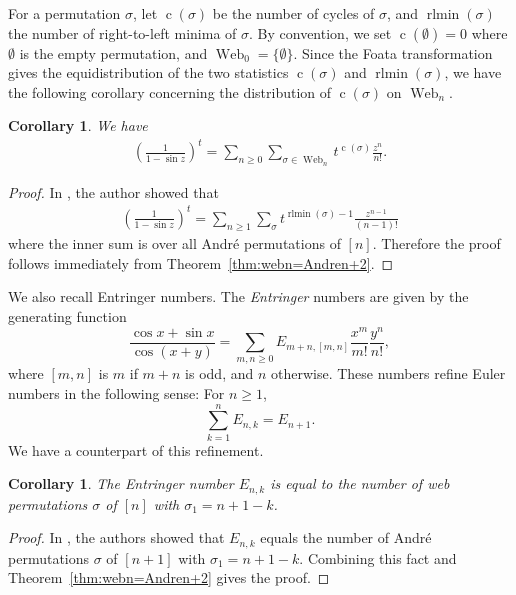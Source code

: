 \documentclass[reqno,12pt]{amsart}
\newtheorem{cor}[thm]{Corollary}
\theoremstyle{definition}
\theoremstyle{remark}
\newcommand\rlmin{\operatorname{rlmin}}
\newcommand\cc{\operatorname{c}}
\newcommand\Web{\operatorname{Web}}
\begin{document}
For a permutation \( \sigma \), let \( \cc(\sigma) \) be the number of cycles of
\( \sigma \), and \( \rlmin(\sigma) \) the number of right-to-left minima of
\( \sigma \).
By convention, we set \( \cc(\emptyset) = 0 \) where \( \emptyset \) is
the empty permutation, and \( \Web_0=\{\emptyset\}. \)
Since the Foata transformation gives the equidistribution of the two statistics
\( \cc(\sigma) \) and \( \rlmin(\sigma) \), we have the following corollary
concerning the distribution of \( \cc(\sigma) \) on \( \Web_n \).
\begin{cor} 
  We have
  \begin{align*}
    \left( \frac{1}{1-\sin z} \right)^t =
      \sum_{n\ge 0} \sum_{\sigma\in \Web_n} t^{\cc(\sigma)} \frac{z^{n}}{n!}.
  \end{align*}
\end{cor}
\begin{proof} 
  In \cite[Proposition~1]{Dis13}, the author showed that 
  \begin{align*}
    \left( \frac{1}{1-\sin z} \right)^t = \sum_{n\ge 1}\sum_{\sigma}
    t^{\rlmin(\sigma)-1} \frac{z^{n-1}}{(n-1)! }
  \end{align*}
  where the inner sum is over all Andr\'e permutations of \( [n] \).
  Therefore the proof follows immediately from Theorem~\ref{thm:webn=Andren+2}.
\end{proof}

We also recall Entringer numbers.
The \emph{Entringer} numbers are given by
the generating function
\[
  \frac{\cos x + \sin x}{\cos (x+y)} = \sum_{m,n \ge 0} E_{m+n,[m,n]} \frac{x^m}{m!} \frac{y^n}{n!},
\]
where \( [m,n] \) is \( m \) if \( m+n \) is odd, and \( n \) otherwise.
These numbers refine Euler numbers in the following sense: For \( n\ge 1 \),
\[
  \sum_{k=1}^n E_{n,k} = E_{n+1}.
\]
We have a counterpart of this refinement.
\begin{cor} 
  The Entringer number \( E_{n,k} \) is equal to the number of web permutations \( \sigma \) of \( [n] \) with \( \sigma_1 = n+1-k \).
\end{cor}
\begin{proof} 
  In \cite[Theorem~1.1]{FH16}, the authors showed that \( E_{n,k} \) equals the
  number of Andr\'e permutations \( \sigma \) of \( [n+1] \) with
  \( \sigma_1 = n+1-k \).
  Combining this fact and Theorem~\ref{thm:webn=Andren+2} gives the proof.
\end{proof}
\end{document}
